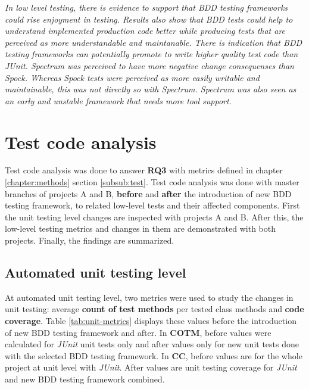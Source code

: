 \begin{topbot}
\textit{In low level testing, there is evidence to support that BDD testing frameworks could rise enjoyment in testing. Results
also show that BDD tests could help to understand implemented production code better while producing tests that are perceived as more understandable
and maintanable. There is indication that BDD testing frameworks can potentially promote to write higher quality test
code than JUnit.\newline\newline
Spectrum was perceived to have more negative change consequenses than Spock. Whereas Spock tests were perceived as more easily
writable and maintainable, this was not directly so with Spectrum. Spectrum was also seen as an early and unstable framework
that needs more tool support.}
\end{topbot}

\section{Test code analysis}
Test code analysis was done to answer \textbf{RQ3} with metrics defined in chapter \ref{chapter:methods} section \ref{subsub:test}.
Test code analysis was done with master branches of projects A and B, \textbf{before} and \textbf{after} the introduction of new BDD testing framework, to related
low-level tests and their affected components. First the unit testing level changes are inspected with projects A and B.
After this, the low-level testing metrics and changes in them are demonstrated with both projects. Finally, the findings are summarized.

\subsection{Automated unit testing level}
\label{subsub:unit-level-metrics}
At automated unit testing level, two metrics were used to study the changes in unit testing: average \textbf{count of test methods}
per tested class methods and \textbf{code coverage}. Table \ref{tab:unit-metrics} displays these values before the introduction
of new BDD testing framework and after. In \textbf{COTM}, before values were calculated for \textit{JUnit} unit tests only and after
values only for new unit tests done with the selected BDD testing framework. In \textbf{CC}, before values are for the
whole project at unit level with \textit{JUnit}. After values are unit testing coverage for \textit{JUnit} and new BDD testing framework
combined.

